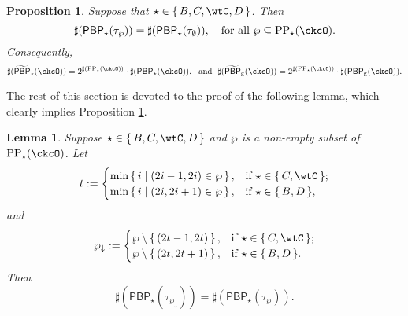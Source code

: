 \documentclass[12pt,a4paper]{amsart}
\numberwithin{equation}{section}
\newtheorem{lem}[thm]{Lemma}
\newtheorem{prop}[thm]{Proposition}
\theoremstyle{remark}
\def\CPPs{\mathrm{PP}_{\star}}
\def\tPBP{\widetilde{\mathsf{PBP}}}
\def\PBP{\mathsf{PBP}}
\def\tPBP{\widetilde{\mathsf{PBP}}}
\begin{document}



    \smallskip


\begin{prop} \label{prop:PBP} Suppose that   $\star\in \set{B,C,\wtC,D}$. Then
  \[
    \sharp(\PBP_{\star}(\tau_{\wp})) = \sharp(\PBP_{\star}(\tau_{\emptyset})), \quad \textrm{for all } \wp \subseteq \CPPs(\ckcO).
  \]
 Consequently, 
  \[
    \sharp(\tPBP_{\star}(\ckcO)) = 2^{\sharp(\CPPs(\ckcO))}\cdot \sharp(\PBP_{\star}(\ckcO)), \,\, \text{ and } \,\, \sharp(\tPBP_{\mathrm g}(\ckcO)) = 2^{\sharp(\CPPs(\ckcO))}\cdot \sharp(\PBP_{\mathrm g}(\ckcO)).
  \]
\end{prop}

The rest of this section is devoted to the proof of the following lemma, which clearly implies Proposition \ref{prop:PBP}. 


\def\PPm{\wp_{\downarrow}}
\def\uptaum{\uptau_{\downarrow}}


\begin{lem}\label{lem:down}
  Suppose $\star \in \set{B, C, \wtC, D}$ and
  $\wp$ is a non-empty subset of $\CPPs(\ckcO)$.
  Let
  \[
    t:=
    \begin{cases}
      \min\set{i|(2i-1,2i)\in \wp}, & \text{if $\star \in \set{C,\wtC}$};\\
      \min\set{i|(2i,2i+1)\in \wp}, & \text{if $\star \in \set{B,D}$},\\
    \end{cases}
  \]
  and
  \[
    \PPm:=
    \begin{cases}
      \wp \setminus \set{(2t-1,2t)},  & \text{if $\star \in \set{C,\wtC}$};\\
      \wp \setminus   \set{(2t,2t+1)}, & \text{if $\star \in \set{B,D}$}.\\
    \end{cases}
  \]
  Then
  \[
    \sharp(\PBP_{\star}(\tau_{\PPm})) = \sharp(\PBP_{\star}(\tau_{\wp})).
  \]
\end{lem}
\end{document}
